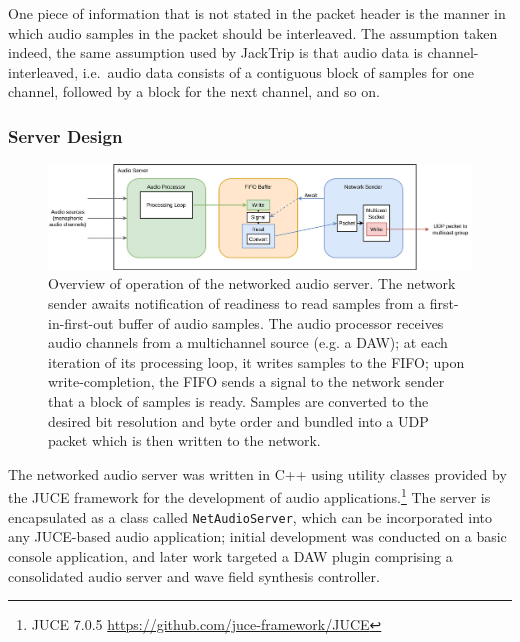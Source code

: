 One piece of information that is not stated in the packet header is the manner
in which audio samples in the packet should be interleaved.
The assumption taken \textemdash{} indeed, the same assumption used by JackTrip
\textemdash{} is that audio data is channel-interleaved, i.e.\ audio data
consists of a contiguous block of samples for one channel, followed by a block
for the next channel, and so on.

\subsubsection{Server Design}

\begin{figure}[ht]
    \centering
    \includegraphics[width=\textwidth]{figures/audio-server}
    \caption{Overview of operation of the networked audio server.
    The network sender awaits notification of readiness to read samples from a
    first-in-first-out buffer of audio samples.
    The audio processor receives audio channels from a multichannel source
        (e.g. a DAW); at each iteration of its processing loop, it writes
        samples to the FIFO; upon write-completion, the FIFO sends a signal to
        the network sender that a block of samples is ready.
        Samples are converted to the desired bit resolution and byte order and
        bundled into a UDP packet which is then written to the network.}
    \label{fig:audio-server}
\end{figure}

The networked audio server was written in C++ using utility classes provided by
the JUCE framework for the development of audio applications.\footnote{
    JUCE 7.0.5 \url{https://github.com/juce-framework/JUCE}
}
The server is encapsulated as a class called \texttt{NetAudioServer},
which can be incorporated into any JUCE-based audio application;
initial development was conducted on a basic console application, and later work
targeted a DAW plugin comprising a consolidated audio server and wave field
synthesis controller.


